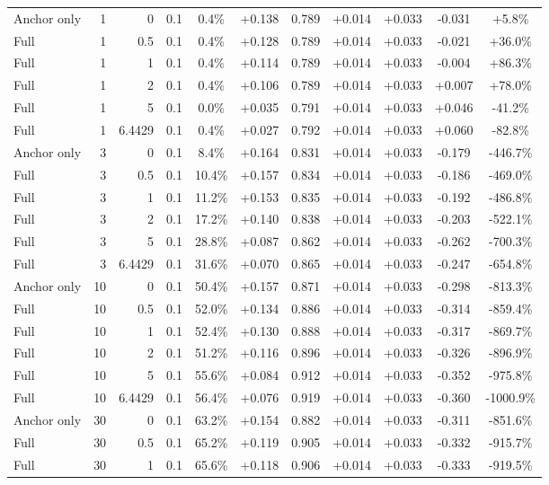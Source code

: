\begin{table}[htbp]
\begin{tabular}{lrrrccccccc}
Anchor only & 1 & 0 & 0.1 & 0.4\% & +0.138 & 0.789 & +0.014 & +0.033 & -0.031 & +5.8\% \\
Full & 1 & 0.5 & 0.1 & 0.4\% & +0.128 & 0.789 & +0.014 & +0.033 & -0.021 & +36.0\% \\
Full & 1 & 1 & 0.1 & 0.4\% & +0.114 & 0.789 & +0.014 & +0.033 & -0.004 & +86.3\% \\
Full & 1 & 2 & 0.1 & 0.4\% & +0.106 & 0.789 & +0.014 & +0.033 & +0.007 & +78.0\% \\
Full & 1 & 5 & 0.1 & 0.0\% & +0.035 & 0.791 & +0.014 & +0.033 & +0.046 & -41.2\% \\
Full & 1 & 6.4429 & 0.1 & 0.4\% & +0.027 & 0.792 & +0.014 & +0.033 & +0.060 & -82.8\% \\
Anchor only & 3 & 0 & 0.1 & 8.4\% & +0.164 & 0.831 & +0.014 & +0.033 & -0.179 & -446.7\% \\
Full & 3 & 0.5 & 0.1 & 10.4\% & +0.157 & 0.834 & +0.014 & +0.033 & -0.186 & -469.0\% \\
Full & 3 & 1 & 0.1 & 11.2\% & +0.153 & 0.835 & +0.014 & +0.033 & -0.192 & -486.8\% \\
Full & 3 & 2 & 0.1 & 17.2\% & +0.140 & 0.838 & +0.014 & +0.033 & -0.203 & -522.1\% \\
Full & 3 & 5 & 0.1 & 28.8\% & +0.087 & 0.862 & +0.014 & +0.033 & -0.262 & -700.3\% \\
Full & 3 & 6.4429 & 0.1 & 31.6\% & +0.070 & 0.865 & +0.014 & +0.033 & -0.247 & -654.8\% \\
Anchor only & 10 & 0 & 0.1 & 50.4\% & +0.157 & 0.871 & +0.014 & +0.033 & -0.298 & -813.3\% \\
Full & 10 & 0.5 & 0.1 & 52.0\% & +0.134 & 0.886 & +0.014 & +0.033 & -0.314 & -859.4\% \\
Full & 10 & 1 & 0.1 & 52.4\% & +0.130 & 0.888 & +0.014 & +0.033 & -0.317 & -869.7\% \\
Full & 10 & 2 & 0.1 & 51.2\% & +0.116 & 0.896 & +0.014 & +0.033 & -0.326 & -896.9\% \\
Full & 10 & 5 & 0.1 & 55.6\% & +0.084 & 0.912 & +0.014 & +0.033 & -0.352 & -975.8\% \\
Full & 10 & 6.4429 & 0.1 & 56.4\% & +0.076 & 0.919 & +0.014 & +0.033 & -0.360 & -1000.9\% \\
Anchor only & 30 & 0 & 0.1 & 63.2\% & +0.154 & 0.882 & +0.014 & +0.033 & -0.311 & -851.6\% \\
Full & 30 & 0.5 & 0.1 & 65.2\% & +0.119 & 0.905 & +0.014 & +0.033 & -0.332 & -915.7\% \\
Full & 30 & 1 & 0.1 & 65.6\% & +0.118 & 0.906 & +0.014 & +0.033 & -0.333 & -919.5\% \\

\end{tabular}
\end{table}
